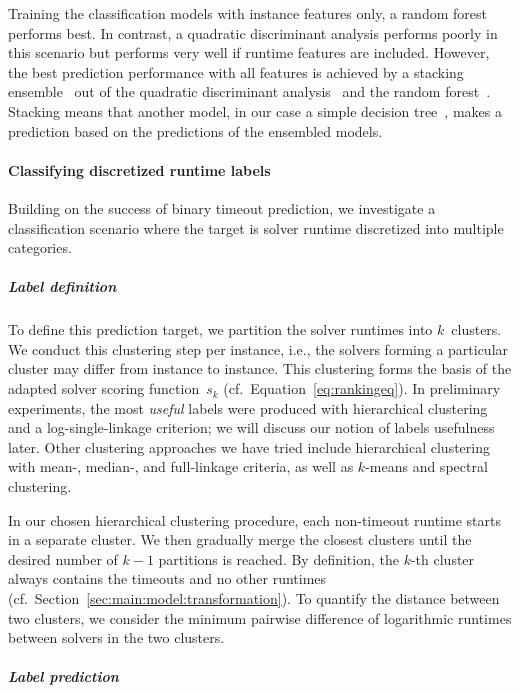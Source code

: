 \documentclass[sn-basic, Numbered]{sn-jnl} %
\begin{document}
Training the classification models with instance features only, a random forest performs best.
In contrast, a quadratic discriminant analysis performs poorly in this scenario but performs very well if runtime features are included.
However, the best prediction performance with all features is achieved by a stacking ensemble~\cite{wolpert1992stacked} out of the quadratic discriminant analysis~\cite{tharwat2016linear} and the random forest~\cite{breiman2001random}.
Stacking means that another model, in our case a simple decision tree~\cite{breiman1984classification}, makes a prediction based on the predictions of the ensembled models.

\paragraph{Classifying discretized runtime labels}

Building on the success of binary timeout prediction, we investigate a classification scenario where the target is solver runtime discretized into multiple categories.

\subparagraph{Label definition}

To define this prediction target, we partition the solver runtimes into $k$~clusters.
We conduct this clustering step per instance, i.e., the solvers forming a particular cluster may differ from instance to instance.
This clustering forms the basis of the adapted solver scoring function~$s_k$ (cf.~Equation~\eqref{eq:rankingeq}).
In preliminary experiments, the most \emph{useful} labels were produced with hierarchical clustering and a log-single-linkage criterion; we will discuss our notion of labels usefulness later.
Other clustering approaches we have tried include hierarchical clustering with mean-, median-, and full-linkage criteria, as well as $k$-means and spectral clustering.

In our chosen hierarchical clustering procedure, each non-timeout runtime starts in a separate cluster.
We then gradually merge the closest clusters until the desired number of $k-1$ partitions is reached.
By definition, the $k$-th cluster always contains the timeouts and no other runtimes (cf.~Section~\ref{sec:main:model:transformation}).
To quantify the distance between two clusters, we consider the minimum pairwise difference of logarithmic runtimes between solvers in the two clusters.

\subparagraph{Label prediction}
\end{document}

